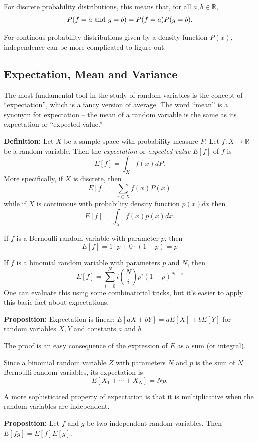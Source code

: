 \documentclass[
  oneside]{scrbook}
\renewcommand{\rm}{}
\begin{document}
For discrete probability distributions, this means that, for all
\(a,b\in\mathbb{R}\), \[
P(f=a\hbox{\rm\ and\ }g=b)=P(f=a)P(g=b).
\]

For continous probability distributions given by a density function
\(P(x)\), independence can be more complicated to figure out.

\hypertarget{expectation-mean-and-variance}{%
\subsection{Expectation, Mean and
Variance}\label{expectation-mean-and-variance}}

The most fundamental tool in the study of random variables is the
concept of ``expectation'', which is a fancy version of average. The
word ``mean'' is a synonym for expectation -- the mean of a random
variable is the same as its expectation or ``expected value.''

\textbf{Definition:} Let \(X\) be a sample space with probability
measure \(P\). Let \(f:X\to \mathbb{R}\) be a random variable. Then the
\emph{expectation} or \emph{expected value} \(E[f]\) of \(f\) is \[
E[f] = \int_X f(x)dP.
\] More specifically, if \(X\) is discrete, then \[
E[f] = \sum_{x\in X} f(x)P(x)
\] while if \(X\) is continuous with probability density function
\(p(x)dx\) then \[
E[f] = \int_{X} f(x)p(x)dx.
\]

If \(f\) is a Bernoulli random variable with parameter \(p\), then \[
E[f] = 1\cdot p+0\cdot (1-p) = p
\]

If \(f\) is a binomial random variable with parameters \(p\) and \(N\),
then \[
E[f] = \sum_{i=0}^{N} i\binom{N}{i}p^{i}(1-p)^{N-i}
\] One can evaluate this using some combinatorial tricks, but it's
easier to apply this basic fact about expectations.

\textbf{Proposition:} Expectation is linear: \(E[aX+bY]=aE[X]+bE[Y]\)
for random variables \(X,Y\) and constants \(a\) and \(b\).

The proof is an easy consequence of the expression of \(E\) as a sum (or
integral).

Since a binomial random variable \(Z\) with parameters \(N\) and \(p\)
is the sum of \(N\) Bernoulli random variables, its expectation is \[
E[X_1+\cdots+X_N]=Np.
\]

A more sophisticated property of expectation is that it is
multiplicative when the random variables are independent.

\textbf{Proposition:} Let \(f\) and \(g\) be two independent random
variables. Then \(E[fg]=E[f]E[g]\).
\end{document}
